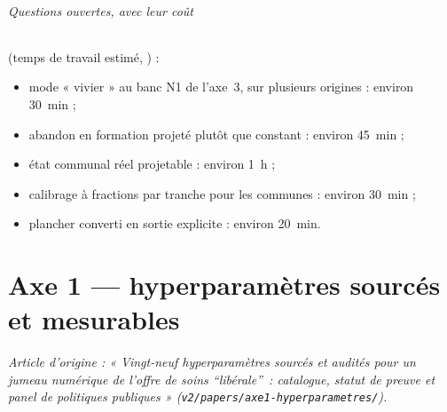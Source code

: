 \paragraph{Questions ouvertes, avec leur coût} (temps de travail estimé, \suppose) :
\begin{itemize}
  \item mode « vivier » au banc N1 de l'axe~3, sur plusieurs origines : environ 30~min ;
  \item abandon en formation projeté plutôt que constant : environ 45~min ;
  \item état communal réel projetable : environ 1~h ;
  \item calibrage à fractions par tranche pour les communes : environ 30~min ;
  \item plancher converti en sortie explicite : environ 20~min.
\end{itemize}



\part{Axe 1 --- hyperparamètres sourcés et mesurables}
\noindent\textit{Article d'origine : « Vingt-neuf hyperparamètres sourcés et audités pour un jumeau numérique de l'offre de soins \enquote{libérale}~: catalogue, statut de preuve et panel de politiques publiques » (\texttt{v2/papers/axe1-hyperparametres/}).}

